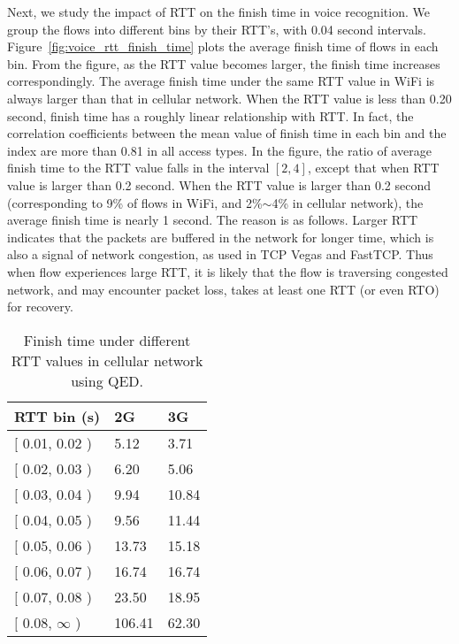 Next, we study the impact of RTT on the finish time in voice recognition. We group the flows into different bins by their RTT's, with 0.04 second intervals. Figure~\ref{fig:voice_rtt_finish_time} plots the average finish time of flows in each bin. From the figure, as the RTT value becomes larger, the finish time increases correspondingly. The average finish time under the same RTT value in WiFi is always larger than that in cellular network. When the RTT value is less than 0.20 second, finish time has a roughly linear relationship with RTT. In fact, the correlation coefficients between the mean value of finish time in each bin and the index are more than 0.81 in all access types. In the figure, the ratio of average finish time to the RTT value falls in the interval $[2, 4]$, except that when RTT value is larger than 0.2 second. When the RTT value is larger than 0.2 second (corresponding to 9\% of flows in WiFi, and 2\%$\sim$4\% in cellular network), the average finish time is nearly 1 second. The reason is as follows. Larger RTT indicates that the packets are buffered in the network for longer time, which is also a signal of network congestion, as used in TCP Vegas\cite{brakmo1995tcp} and FastTCP\cite{wei2006fast}. Thus when flow experiences large RTT, it is likely that the flow is traversing congested network, and may encounter packet loss, takes at least one RTT (or even RTO) for recovery.

\begin{table}[th]
\caption{Finish time under different RTT values in cellular network using QED.}
\label{tab:voice_celluar_qed_rtt}
\centering
\renewcommand{\arraystretch}{1.2}
\begin{tabular}{l|m{.35in}|m{.35in}}
	\toprule
	RTT bin (s) & 2G & 3G \\
	\midrule
	$[$ 0.01, 0.02 ) & 5.12 & 3.71 \\
	\hline
	$[$ 0.02, 0.03 ) & 6.20 & 5.06 \\
	\hline 
	$[$ 0.03, 0.04 ) & 9.94 & 10.84 \\
	\hline 
	$[$ 0.04, 0.05 ) & 9.56 & 11.44 \\
	\hline 
	$[$ 0.05, 0.06 ) & 13.73 & 15.18 \\
	\hline 
	$[$ 0.06, 0.07 ) & 16.74 & 16.74 \\
	\hline 
	$[$ 0.07, 0.08 ) & 23.50 & 18.95 \\
	\hline 
	$[$ 0.08, $\infty$ ) & 106.41 & 62.30 \\
	\bottomrule
\end{tabular}
\end{table}

